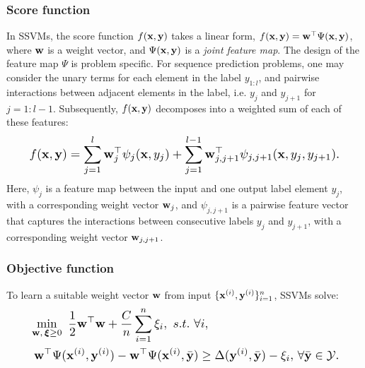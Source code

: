 \subsubsection{Score function}
In SSVMs, %
the score function $f(\mathbf{x}, \mathbf{y})$ takes a linear form, \ie
$f(\mathbf{x}, \mathbf{y}) = \mathbf{w}^\top \Psi(\mathbf{x}, \mathbf{y})$,
where $\mathbf{w}$ is a weight vector, and $\Psi(\mathbf{x}, \mathbf{y})$ is a \emph{joint feature map}.
The design of the feature map $\Psi$ is problem specific.
For sequence prediction problems,
one may
consider the unary
terms for each element in the label $y_{1:l}$, and pairwise interactions between
adjacent elements in the label,
i.e. $y_j$ and $y_{j+1}$ for $j=1 \! : \! l \!-\! 1$.
Subsequently, $f(\mathbf{x},\mathbf{y})$ decomposes into a weighted sum of
each of these features: %
\begin{equation}
\label{eq:jointfeature}
\resizebox{0.909\linewidth}{!}{$\displaystyle
f(\x, \y) = %
\sum_{j=1}^l \w_j^\top \psi_j(\x, y_j) + \sum_{j=1}^{l-1} \w_{j,j+1}^\top \psi_{j,j+1}(\x, y_{j}, y_{j+1}).
$}
\end{equation}
Here, $\psi_j$ is a feature map between the input and one output label element $y_j$, with a corresponding weight vector $\mathbf{w}_j$,
and $\psi_{j,j+1}$ is a pairwise feature vector that captures the interactions between consecutive labels $y_j$ and $y_{j+1}$,
with a corresponding weight vector $\mathbf{w}_{j,j+1}$.

\subsubsection{Objective function}
To learn a suitable weight vector $\mathbf{w}$ from input $\{\mathbf{x}^{({i})}, \mathbf{y}^{({i})}\}_{i=1}^n$,
SSVMs solve: %
\begin{equation}
\label{eq:nslack}
\resizebox{0.909\linewidth}{!}{$\displaystyle
\begin{aligned}
& \min_{\w, \, \bm{\xi} \ge 0} \ \frac{1}{2} \w^\top \w + \frac{C}{n} \sum_{i=1}^n \xi_i, 
\ s.t. \ \forall i, \\
& \ \w^\top \Psi(\x^{(i)}, \y^{(i)}) - \w^\top \Psi(\x^{(i)}, \bar{\y}) \ge
  \Delta(\y^{(i)}, \bar{\y}) - \xi_i, \, \forall \bar\y \in \mathcal{Y}.
\end{aligned}
$} %
\end{equation}

